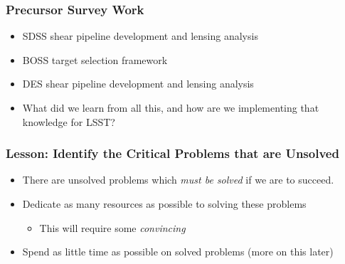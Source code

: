 \documentclass{beamer}
\begin{document}
\frame
{
    \frametitle{Precursor Survey Work}

    \begin{itemize}

        \item SDSS shear pipeline development and lensing analysis

        \item BOSS target selection framework

        \item DES shear pipeline development and lensing analysis

        \item What did we learn from all this, and how are we implementing
            that knowledge for LSST?

    \end{itemize}

}

\frame
{
    \frametitle{Lesson: Identify the Critical Problems that are Unsolved}

    \begin{itemize}

        \item There are unsolved problems which {\em must be solved} if we are to succeed.

        \item Dedicate as many resources as possible to solving these problems

            \begin{itemize}
                \item This will require some {\em convincing}
            \end{itemize}

        \item Spend as little time as possible on solved problems (more on this later)

    \end{itemize}

}
\end{document}

